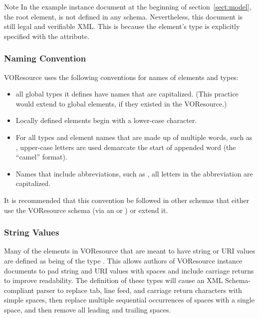 \documentclass[11pt,a4paper]{ivoa}
\begin{document}
\begin{admonition}{Note}
In the example instance
document at the beginning of section~\ref{sect:model}, the root element,
 is not defined in any schema.
Nevertheless, this document is still legal and verifiable XML.
This is because the element's type is explicitly specified with
the  attribute.
\end{admonition}


\subsubsection{Naming Convention}

VOResource uses the following conventions for
names of elements and types:

\begin{itemize}
  \item all global types it defines have names that are capitalized.
       (This practice would extend to global elements, if they existed
       in the VOResource.)   
  \item Locally defined elements begin with a lower-case character. 
  \item For all types and element names that are made up of multiple
       words, such as , upper-case letters are
       used demarcate the start of appended word (the ``camel''
       format).  
  \item Names that include abbreviations, such as
       , all letters in the abbreviation are
       capitalized.  
\end{itemize}

It is recommended that this convention be followed in other schemas
that either use the VOResource schema (via an  or
) or extend it.  


\subsubsection{String Values}

Many of the elements in VOResource that are meant to have string or
URI values are defined as being of the type .
This allows authors of VOResource instance documents to pad string and
URI values with spaces and include carriage returns to improve
readability.  The definition of these types will cause an XML
Schema-compliant parser to replace tab, line feed, and carriage return
characters with simple spaces, then replace multiple sequential
occurrences of spaces with a single space, and then remove all leading
and trailing spaces.
\end{document}
